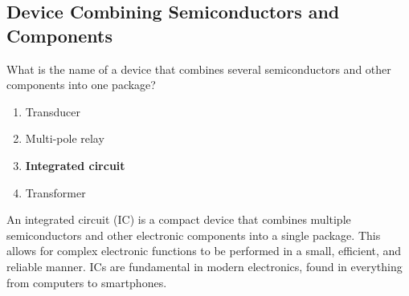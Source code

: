 \subsection{Device Combining Semiconductors and Components}
\label{T6D09}

\begin{tcolorbox}[colback=gray!10!white,colframe=black!75!black,title=T6D09]
What is the name of a device that combines several semiconductors and other components into one package?
\begin{enumerate}[noitemsep]
    \item Transducer
    \item Multi-pole relay
    \item \textbf{Integrated circuit}
    \item Transformer
\end{enumerate}
\end{tcolorbox}

An integrated circuit (IC) is a compact device that combines multiple semiconductors and other electronic components into a single package. This allows for complex electronic functions to be performed in a small, efficient, and reliable manner. ICs are fundamental in modern electronics, found in everything from computers to smartphones.